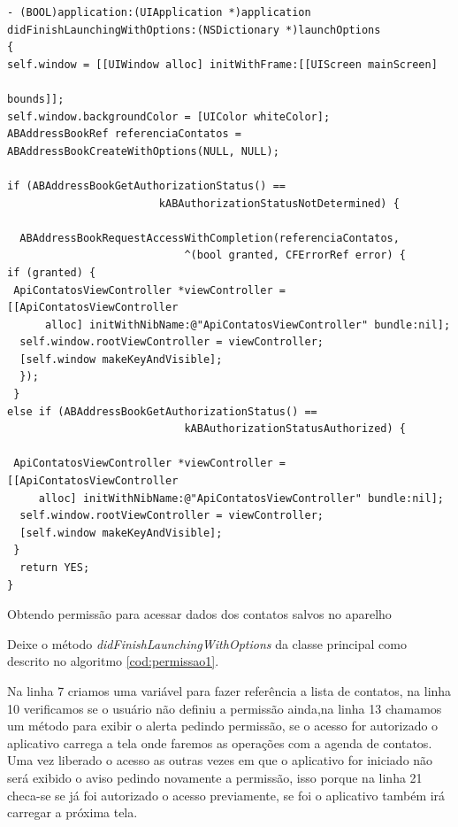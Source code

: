 \documentclass[a4paper,12pt,brazil,oneside]{book}
\begin{document}
\begin{listing}[H]
\begin{verbatim}
- (BOOL)application:(UIApplication *)application
didFinishLaunchingWithOptions:(NSDictionary *)launchOptions
{
self.window = [[UIWindow alloc] initWithFrame:[[UIScreen mainScreen] 
                                                                                          bounds]];
self.window.backgroundColor = [UIColor whiteColor];
ABAddressBookRef referenciaContatos = 
ABAddressBookCreateWithOptions(NULL, NULL);
    
if (ABAddressBookGetAuthorizationStatus() == 
						kABAuthorizationStatusNotDetermined) {
						
  ABAddressBookRequestAccessWithCompletion(referenciaContatos, 
  							^(bool granted, CFErrorRef error) {
if (granted) {
 ApiContatosViewController *viewController = [[ApiContatosViewController 
      alloc] initWithNibName:@"ApiContatosViewController" bundle:nil];
  self.window.rootViewController = viewController;
  [self.window makeKeyAndVisible]; 
  });
 }
else if (ABAddressBookGetAuthorizationStatus() == 
   							kABAuthorizationStatusAuthorized) {
							
 ApiContatosViewController *viewController = [[ApiContatosViewController 
     alloc] initWithNibName:@"ApiContatosViewController" bundle:nil];
  self.window.rootViewController = viewController;
  [self.window makeKeyAndVisible];
 }
  return YES;
}
\end{verbatim}
\caption{Obtendo permissão para acessar dados dos contatos salvos no aparelho}
\label{cod:permissao1}
\end{listing}

Deixe o método \emph{didFinishLaunchingWithOptions} da classe principal como descrito no algoritmo \ref{cod:permissao1}.

Na linha 7 criamos uma variável para fazer referência a lista de contatos, na linha 10 verificamos se o usuário não definiu a permissão ainda,na linha 13 chamamos um método para exibir o alerta pedindo permissão, se o acesso for autorizado o aplicativo carrega a tela onde faremos as operações com a agenda de contatos. Uma vez liberado o acesso as outras vezes em que o aplicativo for iniciado não será exibido o aviso pedindo novamente a permissão, isso porque na linha 21 checa-se se já foi autorizado o acesso previamente, se foi o aplicativo também irá carregar a próxima tela.
\end{document}
